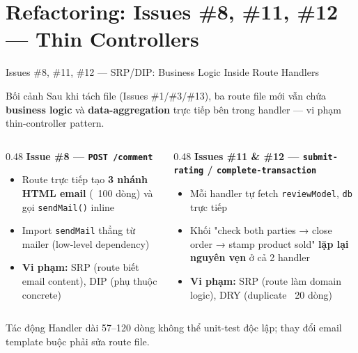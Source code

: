 \documentclass[12pt]{beamer}
\begin{document}
\section{Refactoring: Issues \#8, \#11, \#12 — Thin Controllers}

\begin{frame}{Issues \#8, \#11, \#12 — SRP/DIP: Business Logic Inside Route Handlers}
  \begin{block}{Bối cảnh}
    Sau khi tách file (Issues \#1/\#3/\#13), ba route file mới vẫn chứa \textbf{business logic} và
    \textbf{data-aggregation} trực tiếp bên trong handler — vi phạm thin-controller pattern.
  \end{block}

  \medskip
  \begin{columns}[T]
    \begin{column}{0.48\textwidth}
      \textbf{Issue \#8 — \texttt{POST /comment}}
      \begin{itemize}
        \item Route trực tiếp tạo \textbf{3 nhánh HTML email} (~100 dòng) và gọi \texttt{sendMail()} inline
        \item Import \texttt{sendMail} thẳng từ mailer (low-level dependency)
        \item \textbf{Vi phạm:} SRP (route biết email content), DIP (phụ thuộc concrete)
      \end{itemize}
    \end{column}
    \begin{column}{0.48\textwidth}
      \textbf{Issues \#11 \& \#12 — \texttt{submit-rating} / \texttt{complete-transaction}}
      \begin{itemize}
        \item Mỗi handler tự fetch \texttt{reviewModel}, \texttt{db} trực tiếp
        \item Khối "check both parties → close order → stamp product sold" \textbf{lặp lại nguyên vẹn} ở cả 2 handler
        \item \textbf{Vi phạm:} SRP (route làm domain logic), DRY (duplicate ~20 dòng)
      \end{itemize}
    \end{column}
  \end{columns}

  \medskip
  \begin{alertblock}{Tác động}
    Handler dài 57–120 dòng không thể unit-test độc lập; thay đổi email template buộc phải sửa route file.
  \end{alertblock}
\end{frame}
\end{document}
